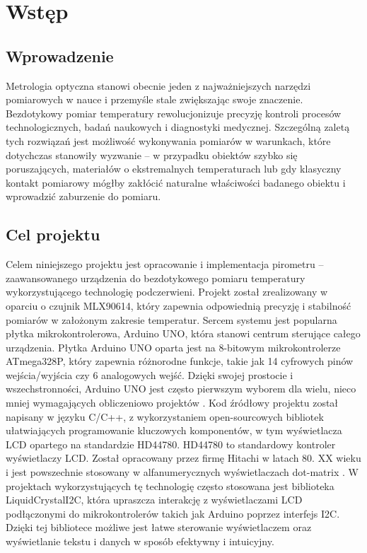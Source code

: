 \chapter{Wstęp}
    \section{Wprowadzenie}
    Metrologia optyczna stanowi obecnie jeden z najważniejszych narzędzi pomiarowych w nauce i przemyśle stale zwiększając swoje znaczenie. Bezdotykowy pomiar temperatury rewolucjonizuje precyzję kontroli procesów technologicznych, badań naukowych i diagnostyki medycznej. Szczególną zaletą tych rozwiązań jest możliwość wykonywania pomiarów w warunkach, które dotychczas stanowiły wyzwanie – w przypadku obiektów szybko się poruszających, materiałów o ekstremalnych temperaturach lub gdy klasyczny kontakt pomiarowy mógłby zakłócić naturalne właściwości badanego obiektu i wprowadzić zaburzenie do pomiaru.
    \section{Cel projektu}
    Celem niniejszego projektu jest opracowanie i implementacja pirometru – zaawansowanego urządzenia do bezdotykowego pomiaru temperatury wykorzystującego technologię podczerwieni. Projekt został zrealizowany w oparciu o czujnik MLX90614, który zapewnia odpowiednią precyzję i stabilność pomiarów w założonym zakresie temperatur. Sercem systemu jest popularna płytka mikrokontrolerowa, Arduino UNO, która stanowi centrum sterujące całego urządzenia. Płytka Arduino UNO oparta jest na 8-bitowym mikrokontrolerze ATmega328P, który zapewnia różnorodne funkcje, takie jak 14 cyfrowych pinów wejścia/wyjścia czy 6 analogowych wejść. Dzięki swojej prostocie i wszechstronności, Arduino UNO jest często pierwszym wyborem dla wielu, nieco mniej wymagających obliczeniowo projektów \cite{1}. Kod źródłowy projektu został napisany w języku C/C++, z wykorzystaniem open-sourcowych bibliotek ułatwiających programowanie kluczowych komponentów, w tym wyświetlacza LCD opartego na standardzie HD44780. HD44780 to standardowy kontroler wyświetlaczy LCD. Został opracowany przez firmę Hitachi w latach 80. XX wieku i jest powszechnie stosowany w alfanumerycznych wyświetlaczach dot-matrix \cite{2}. W projektach wykorzystujących tę technologię często stosowana jest biblioteka LiquidCrystalI2C, która upraszcza interakcję z wyświetlaczami LCD podłączonymi do mikrokontrolerów takich jak Arduino poprzez interfejs I2C. Dzięki tej bibliotece możliwe jest łatwe sterowanie wyświetlaczem oraz wyświetlanie tekstu i danych w sposób efektywny i intuicyjny. 

